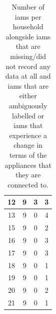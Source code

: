 \begin{table}[H]
\begin{adjustwidth}{-0.5cm}{-0.5cm}
\begin{tabular}{cccc}
                        12                        & 9                           & 3                            & 3                              \\ \midrule
                        13                        & 9                           & 0                            & 4                              \\ \midrule
                        15                        & 9                           & 0                            & 2                              \\ \midrule
                        16                        & 9                           & 0                            & 3                              \\ \midrule
                        17                        & 9                           & 0                            & 3                              \\ \midrule
                        18                        & 9                           & 0                            & 1                              \\ \midrule
                        19                        & 9                           & 0                            & 1                              \\ \midrule
                        20                        & 9                           & 0                            & 2                              \\ \midrule
                        21                        & 9                           & 0                            & 1                              \\ \bottomrule
                \end{tabular}
                \caption{Number of \glspl{iam} per household alongside \glspl{iam} that are missing/did not record any data at all and \glspl{iam} that are either ambiguously labelled or \glspl{iam} that experience a change in terms of the appliances that they are connected to.}
                \label{tab:REFIT-missing-labels}
        \end{adjustwidth}
\end{table}

